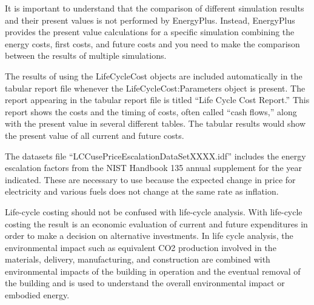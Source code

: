 It is important to understand that the comparison of different simulation results and their present values is not performed by EnergyPlus. Instead, EnergyPlus provides the present value calculations for a specific simulation combining the energy costs, first costs, and future costs and you need to make the comparison between the results of multiple simulations.

The results of using the LifeCycleCost objects are included automatically in the tabular report file whenever the LifeCycleCost:Parameters object is present. The report appearing in the tabular report file is titled ``Life Cycle Cost Report.'' This report shows the costs and the timing of costs, often called ``cash flows,'' along with the present value in several different tables. The tabular results would show the present value of all current and future costs.

The datasets file ``LCCusePriceEscalationDataSetXXXX.idf'' includes the energy escalation factors from the NIST Handbook 135 annual supplement for the year indicated. These are necessary to use because the expected change in price for electricity and various fuels does not change at the same rate as inflation.

Life-cycle costing should not be confused with life-cycle analysis. With life-cycle costing the result is an economic evaluation of current and future expenditures in order to make a decision on alternative investments. In life cycle analysis, the environmental impact such as equivalent CO2 production involved in the materials, delivery, manufacturing, and construction are combined with environmental impacts of the building in operation and the eventual removal of the building and is used to understand the overall environmental impact or embodied energy.
